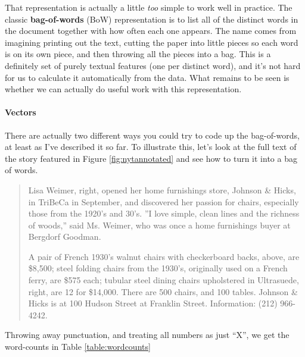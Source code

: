 \documentclass{article}
\begin{document}
That representation is actually a little {\em too} simple to work well in
practice.  The classic {\bf bag-of-words} (BoW) representation is to list all
of the distinct words in the document together with how often each one appears.
The name comes from imagining printing out the text, cutting the paper into
little pieces so each word is on its own piece, and then throwing all the
pieces into a bag.  This is a definitely set of purely textual features (one
per distinct word), and it's not hard for us to calculate it automatically from
the data.  What remains to be seen is whether we can actually do useful work
with this representation.

\paragraph{Vectors} There are actually two different ways you could
try to code up the bag-of-words, at least as I've described it so far.  
To illustrate this, let's look at the full text of the story featured in Figure \ref{fig:nytannotated} and see how to turn it into a bag of words.
\begin{quotation}
  Lisa Weimer, right, opened her home furnishings store, Johnson \& Hicks, in
  TriBeCa in September, and discovered her passion for chairs, especially those
  from the 1920's and 30's. ''I love simple, clean lines and the richness of
  woods,'' said Ms. Weimer, who was once a home furnishings buyer at Bergdorf
  Goodman.

  A pair of French 1930's walnut chairs with checkerboard backs, above, are
  \$8,500; steel folding chairs from the 1930's, originally used on a French
  ferry, are \$575 each; tubular steel dining chairs upholstered in Ultrasuede,
  right, are 12 for \$14,000. There are 500 chairs, and 100 tables. Johnson \&
  Hicks is at 100 Hudson Street at Franklin Street. Information: (212)
  966-4242.
\end{quotation}

Throwing away punctuation, and treating all numbers as just ``X'', we
get the word-counts in Table \ref{table:wordcounts}
\end{document}
